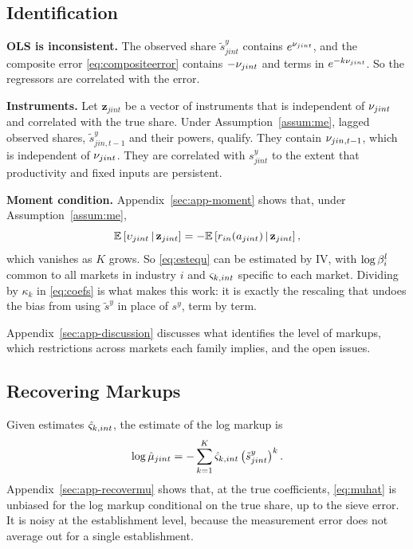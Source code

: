 \subsection{Identification}\label{sec:ident}

\textbf{OLS is inconsistent.}
The observed share $\tilde{s}^y_{jint}$ contains $e^{\nu_{jint}}$, and the composite error \eqref{eq:compositeerror} contains $-\nu_{jint}$ and terms in $e^{-k\nu_{jint}}$.
So the regressors are correlated with the error.

\textbf{Instruments.}
Let $\mathbf{z}_{jint}$ be a vector of instruments that is independent of $\nu_{jint}$ and correlated with the true share.
Under Assumption~\ref{assum:me}, lagged observed shares, $\tilde{s}^y_{jin,t-1}$ and their powers, qualify.
They contain $\nu_{jin,t-1}$, which is independent of $\nu_{jint}$.
They are correlated with $s^y_{jint}$ to the extent that productivity and fixed inputs are persistent.

\textbf{Moment condition.}
Appendix~\ref{sec:app-moment} shows that, under Assumption~\ref{assum:me},
\begin{equation}\label{eq:moment}
	\mathbb{E}\left[\upsilon_{jint} \,\middle|\, \mathbf{z}_{jint}\right] = -\mathbb{E}\left[r_{in}(a_{jint}) \,\middle|\, \mathbf{z}_{jint}\right],
\end{equation}
which vanishes as $K$ grows.
So \eqref{eq:estequ} can be estimated by IV, with $\log \beta^l_i$ common to all markets in industry $i$ and $\varsigma_{k,int}$ specific to each market.
Dividing by $\kappa_k$ in \eqref{eq:coefs} is what makes this work: it is exactly the rescaling that undoes the bias from using $\tilde{s}^y$ in place of $s^y$, term by term.

Appendix~\ref{sec:app-discussion} discusses what identifies the level of markups, which restrictions across markets each family implies, and the open issues.

\subsection{Recovering Markups}\label{sec:recovermu}

Given estimates $\hat{\varsigma}_{k,int}$, the estimate of the log markup is
\begin{equation}\label{eq:muhat}
	\log \hat{\mu}_{jint} = -\sum_{k=1}^{K} \hat{\varsigma}_{k,int} \left(\tilde{s}^y_{jint}\right)^k.
\end{equation}
Appendix~\ref{sec:app-recovermu} shows that, at the true coefficients, \eqref{eq:muhat} is unbiased for the log markup conditional on the true share, up to the sieve error.
It is noisy at the establishment level, because the measurement error does not average out for a single establishment.


